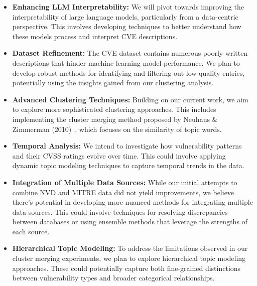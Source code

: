 \documentclass[12pt]{article}
\begin{document}
\begin{itemize}

	\item \textbf{Enhancing LLM Interpretability:} We will pivot towards improving the
	      interpretability of large language models, particularly from a data-centric perspective.
	      This involves developing techniques to better understand how these models process and
	      interpret CVE descriptions.

	\item \textbf{Dataset Refinement:} The CVE dataset contains numerous poorly written descriptions
	      that hinder machine learning model performance. We plan to develop robust methods for
	      identifying and filtering out low-quality entries, potentially using the insights gained
	      from our clustering analysis.

	\item \textbf{Advanced Clustering Techniques:} Building on our current work, we aim to explore
	      more sophisticated clustering approaches. This includes implementing the cluster merging
	      method proposed by Neuhaus \& Zimmerman (2010)~\cite{cve_topic_modelling}, which focuses on
	      the similarity of topic words.

	\item \textbf{Temporal Analysis:} We intend to investigate how vulnerability patterns and their
	      CVSS ratings evolve over time. This could involve applying dynamic topic modeling techniques
	      to capture temporal trends in the data.

	\item \textbf{Integration of Multiple Data Sources:} While our initial attempts to combine NVD
	      and MITRE data did not yield improvements, we believe there's potential in developing more
	      nuanced methods for integrating multiple data sources. This could involve techniques for
	      resolving discrepancies between databases or using ensemble methods that leverage the
	      strengths of each source.

	\item \textbf{Hierarchical Topic Modeling:} To address the limitations observed in our cluster
	      merging experiments, we plan to explore hierarchical topic modeling approaches. These could
	      potentially capture both fine-grained distinctions between vulnerability types and broader
	      categorical relationships.

\end{itemize}
\end{document}
